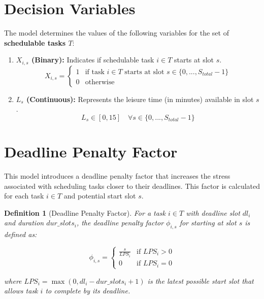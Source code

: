 \documentclass{article}
\newtheorem{definition}{Definition} %
\begin{document}
\section{Decision Variables}

The model determines the values of the following variables for the set of \textbf{schedulable tasks $T$}:

\begin{enumerate}
    \item \textbf{$X_{i,s}$ (Binary):} Indicates if schedulable task $i \in T$ starts at slot $s$.
    \[ X_{i,s} = \begin{cases} 1 & \text{if task } i \in T \text{ starts at slot } s \in \{0, ..., S_{total}-1\} \\ 0 & \text{otherwise} \end{cases} \]

    \item \textbf{$L_{s}$ (Continuous):} Represents the leisure time (in minutes) available in slot $s$.
    \[ L_{s} \in [0, 15] \quad \forall s \in \{0, ..., S_{total}-1\} \]
\end{enumerate}

\section{Deadline Penalty Factor}

This model introduces a deadline penalty factor that increases the stress associated with scheduling tasks closer to their deadlines. This factor is calculated for each task $i \in T$ and potential start slot $s$.

\begin{definition}[Deadline Penalty Factor]
For a task $i \in T$ with deadline slot $dl_i$ and duration $dur\_slots_i$, the deadline penalty factor $\phi_{i,s}$ for starting at slot $s$ is defined as:

\begin{equation}
\phi_{i,s} = 
\begin{cases}
\frac{s}{LPS_i} & \text{if } LPS_i > 0 \\
0 & \text{if } LPS_i = 0
\end{cases}
\label{eq:deadline_penalty_factor}
\end{equation}

where $LPS_i = \max(0, dl_i - dur\_slots_i + 1)$ is the latest possible start slot that allows task $i$ to complete by its deadline.
\end{definition}
\end{document}
